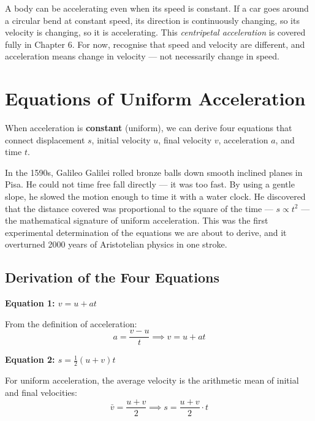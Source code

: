 \begin{misconceptionbox}
A body can be accelerating even when its speed is
constant. If a car goes around a circular bend at constant
speed, its direction is continuously changing, so its
velocity is changing, so it is accelerating. This
\textit{centripetal acceleration} is covered fully in
Chapter 6. For now, recognise that speed and velocity
are different, and acceleration means change in velocity
--- not necessarily change in speed.
\end{misconceptionbox}

\section{Equations of Uniform Acceleration}

When acceleration is \textbf{constant} (uniform), we can
derive four equations that connect displacement $s$,
initial velocity $u$, final velocity $v$, acceleration $a$,
and time $t$.

\begin{historybox}
In the 1590s, Galileo Galilei rolled bronze balls down
smooth inclined planes in Pisa. He could not time free
fall directly --- it was too fast. By using a gentle slope,
he slowed the motion enough to time it with a water clock.
He discovered that the distance covered was proportional
to the square of the time --- $s \propto t^2$ --- the
mathematical signature of uniform acceleration. This was
the first experimental determination of the equations we
are about to derive, and it overturned 2000 years of
Aristotelian physics in one stroke.
\end{historybox}

\subsection{Derivation of the Four Equations}

\textbf{Equation 1: $v = u + at$}

From the definition of acceleration:
\[
  a = \frac{v - u}{t}
  \implies \boxed{v = u + at}
\]

\textbf{Equation 2: $s = \frac{1}{2}(u + v)t$}

For uniform acceleration, the average velocity is the
arithmetic mean of initial and final velocities:
\[
  \bar{v} = \frac{u + v}{2}
  \implies \boxed{s = \frac{u+v}{2}\cdot t}
\]

